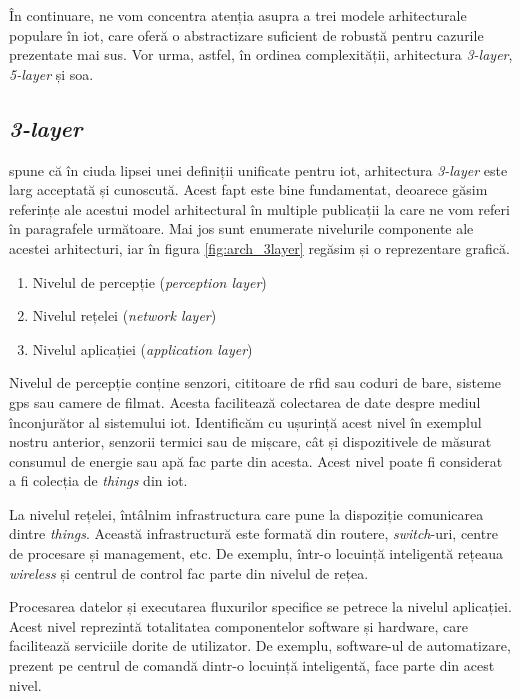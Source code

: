 În continuare, ne vom concentra atenția asupra a trei modele arhitecturale populare în \acrshort{iot}, care oferă o abstractizare suficient de robustă pentru cazurile prezentate mai sus. Vor urma, astfel, în ordinea complexității, arhitectura \textit{3-layer}, \textit{5-layer} și \acrlong{soa}.

\subsection*{\textit{3-layer}}

\citet{MiaoWu2010} spune că în ciuda lipsei unei definiții unificate pentru \acrshort{iot}, arhitectura \textit{3-layer} este larg acceptată și cunoscută. Acest fapt este bine fundamentat, deoarece găsim referințe ale acestui model arhitectural în multiple publicații la care ne vom referi în paragrafele următoare. Mai jos sunt enumerate nivelurile componente ale acestei arhitecturi, iar în figura \ref{fig:arch_3layer} regăsim și o reprezentare grafică.

\begin{enumerate}
    \item Nivelul de percepție (\textit{perception layer})
    \item Nivelul rețelei (\textit{network layer})
    \item Nivelul aplicației (\textit{application layer})
\end{enumerate}

Nivelul de percepție conține senzori, cititoare de \acrshort{rfid} sau coduri de bare, sisteme \acrfull{gps} sau camere de filmat. Acesta facilitează colectarea de date despre mediul înconjurător al sistemului \acrshort{iot}. Identificăm cu ușurință acest nivel în exemplul nostru anterior, senzorii termici sau de mișcare, cât și dispozitivele de măsurat consumul de energie sau apă fac parte din acesta. Acest nivel poate fi considerat a fi colecția de \textit{things} din \acrshort{iot}.

La nivelul rețelei, întâlnim infrastructura care pune la dispoziție comunicarea dintre \textit{things}. Această infrastructură este formată din routere, \textit{switch}-uri, centre de procesare și management, etc. De exemplu, într-o locuință inteligentă rețeaua \textit{wireless} și centrul de control fac parte din nivelul de rețea.

Procesarea datelor și executarea fluxurilor specifice se petrece la nivelul aplicației. Acest nivel reprezintă totalitatea componentelor software și hardware, care facilitează serviciile dorite de utilizator. De exemplu, software-ul de automatizare, prezent pe centrul de comandă dintr-o locuință inteligentă, face parte din acest nivel.

